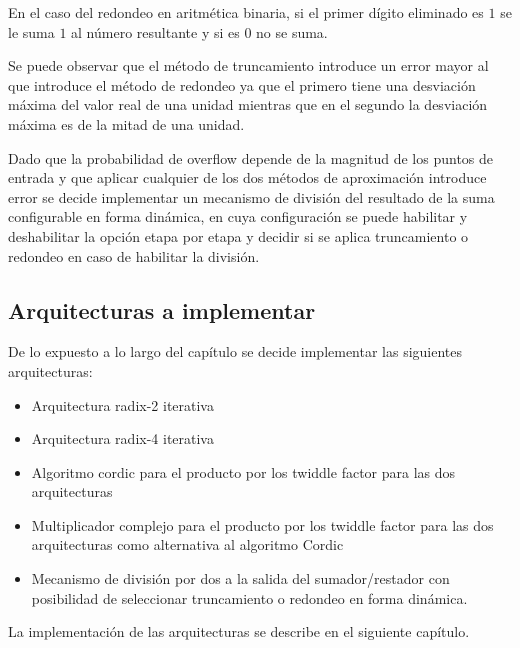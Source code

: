 En el caso del redondeo en aritmética binaria, si el primer dígito eliminado es $1$ se le suma $1$
al número resultante y si es $0$ no se suma.

Se puede observar que el método de truncamiento introduce un error mayor al que introduce el método
de redondeo ya que el primero tiene una desviación máxima del valor real de una unidad mientras que
en el segundo la desviación máxima es de la mitad de una unidad.

Dado que la probabilidad de overflow depende de la magnitud de los puntos de entrada y que aplicar
cualquier de los dos métodos de aproximación introduce error se decide implementar un mecanismo de
división del resultado de la suma configurable en forma dinámica, en cuya configuración se puede
habilitar y deshabilitar la opción etapa por etapa y decidir si se aplica truncamiento o redondeo en
caso de habilitar la división.

\subsection{Arquitecturas a implementar}

De lo expuesto a lo largo del capítulo se decide implementar las siguientes arquitecturas:

\begin{itemize}
  \item Arquitectura radix-2 iterativa
  \item Arquitectura radix-4 iterativa
  \item Algoritmo cordic para el producto por los twiddle factor para las dos arquitecturas
  \item Multiplicador complejo para el producto por los twiddle factor para las dos arquitecturas
  como alternativa al algoritmo Cordic
  \item Mecanismo de división por dos a la salida del sumador/restador con posibilidad de
  seleccionar truncamiento o redondeo en forma dinámica.
\end{itemize}

La implementación de las arquitecturas se describe en el siguiente capítulo.
